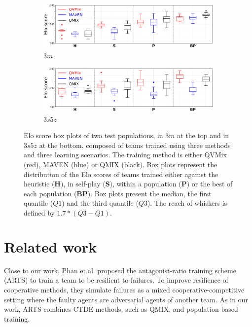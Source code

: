 \begin{figure}[ht]
\centering

\begin{subfigure}{\textwidth}
\centering
\includegraphics[width=\textwidth]{tex_thesis/figures/ch7/3m_tiny_all_no_h_clean.pdf}
\caption{$3m$}
\label{subfig:3m_all_no_h}
\end{subfigure}
\begin{subfigure}{\textwidth}
\centering
\includegraphics[width=\textwidth]{tex_thesis/figures/ch7/3s5z_tiny_all_no_h_clean.pdf}
\caption{$3s5z$}
\label{subfig:3s5z_all_no_h}
\end{subfigure}
\caption{
Elo score box plots of two test populations, in $3m$ at the top and in $3s5z$ at the bottom, composed of teams trained using three methods and three learning scenarios.
The training method is either QVMix (red), MAVEN (blue) or QMIX (black).
Box plots represent the distribution of the Elo scores of teams trained either against the heuristic (\textbf{H}), in self-play (\textbf{S}), within a population (\textbf{P}) or the best of each population (\textbf{BP}).
Box plots present the median, the first quantile ($Q1$) and the third quantile ($Q3$). The reach of whiskers is defined by $1.7*(Q3-Q1)$.
}
\label{fig:all_no_h}
\end{figure}



\section{Related work}
\label{sec:related}
Close to our work, Phan et.al. \citep{phan2020learning} proposed the antagonist-ratio training scheme (ARTS) to train a team to be resilient to failures.
To improve resilience of cooperative methods, they simulate failures as a mixed cooperative-competitive setting where the faulty agents are adversarial agents of another team.
As in our work, ARTS combines CTDE methods, such as QMIX, and population based training.

